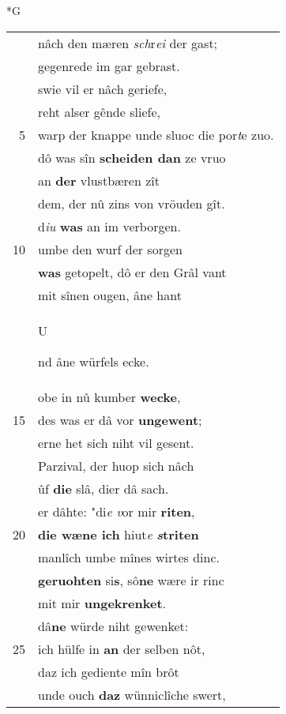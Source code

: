 \documentclass[8pt,a4paper,notitlepage]{article}
\begin{document}
\begin{table}[ht]
\begin{minipage}[t]{0.5\linewidth}
\small
\begin{center}*G
\end{center}
\begin{tabular}{rl}
 & nâch den mæren \textit{sch}r\textit{ei} der gast;\\ 
 & gegenrede im gar gebrast.\\ 
 & swie vil er nâch geriefe,\\ 
 & reht alser gênde sliefe,\\ 
5 & warp der knappe unde sluoc die por\textit{t}e zuo.\\ 
 & dô was sîn \textbf{scheiden dan} ze vruo\\ 
 & an \textbf{der} vlustbæren zît\\ 
 & dem, der nû zins von vröuden gît.\\ 
 & d\textit{iu} \textbf{was} an im verborgen.\\ 
10 & umbe den wurf der sorgen\\ 
 & \textbf{was} getopelt, dô er den Grâl vant\\ 
 & mit sînen ougen, âne hant\\ 
 & \begin{large}U\end{large}nd âne würfels ecke.\\ 
 & obe in nû kumber \textbf{wecke},\\ 
15 & des was er dâ vor \textbf{ungewent};\\ 
 & erne het sich niht vil gesent.\\ 
 & Parzival, der huop sich nâch\\ 
 & ûf \textbf{die} slâ, dier dâ sach.\\ 
 & er dâhte: "di\textit{e} \textit{v}or mir \textbf{riten},\\ 
20 & \textbf{die wæne ich} hiut\textit{e} \textbf{\textit{s}triten}\\ 
 & manlîch umbe mînes wirtes dinc.\\ 
 & \textbf{geruohten} si\textbf{s}, sô\textbf{ne} wære ir rinc\\ 
 & mit mir \textbf{ungekrenket}.\\ 
 & dâ\textbf{ne} würde niht gewenket:\\ 
25 & ich hülfe in \textbf{an} der selben nôt,\\ 
 & daz ich gediente mîn brôt\\ 
 & unde ouch \textbf{daz} wünniclîche swert,\\ 

\end{tabular}
\end{minipage}
\end{table}
\end{document}
